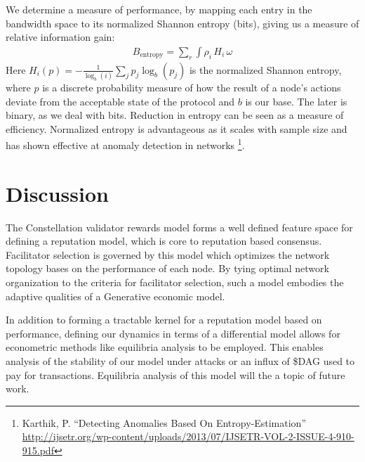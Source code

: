 \documentclass{article}
\begin{document}
We determine a measure of performance, by mapping each entry in the bandwidth space to its normalized Shannon entropy (bits), giving us a measure of relative information gain:
\begin{equation*} \label{eq3}
\begin{split}
B_\mathrm{entropy} = \sum_{r} \int \rho_i\, H_i\, \omega 
\end{split}
\end{equation*}
Here 
{$H_i(p) = - \tfrac{1}{\log_b(i)} \sum_j p_j \log_b(p_j)$}
is the normalized Shannon entropy, where $p$ is a discrete probability measure of how the result of a node's actions deviate from the acceptable state of the protocol and $b$ is our base. The later is binary, as we deal with bits. Reduction in entropy can be seen as a measure of efficiency. Normalized entropy is advantageous as it scales with sample size and has shown effective at anomaly detection in networks
\footnote{Karthik, P. ``Detecting Anomalies Based On Entropy-Estimation''\\ \url{http://ijsetr.org/wp-content/uploads/2013/07/IJSETR-VOL-2-ISSUE-4-910-915.pdf}}.

\section{Discussion}
The Constellation validator rewards model forms a well defined feature space for defining a reputation model, which is core to reputation based consensus. Facilitator selection is governed by this model which optimizes the network topology bases on the performance of each node. By tying optimal network organization to the criteria for facilitator selection, such a model embodies the adaptive qualities of a Generative economic model.

In addition to forming a tractable kernel for a reputation model based on performance, defining our dynamics in terms of a differential model allows for econometric methods like equilibria analysis to be employed. This enables analysis of the stability of our model under attacks or an influx of \$DAG used to pay for transactions. Equilibria analysis of this model will the a topic of future work.


\end{document}
